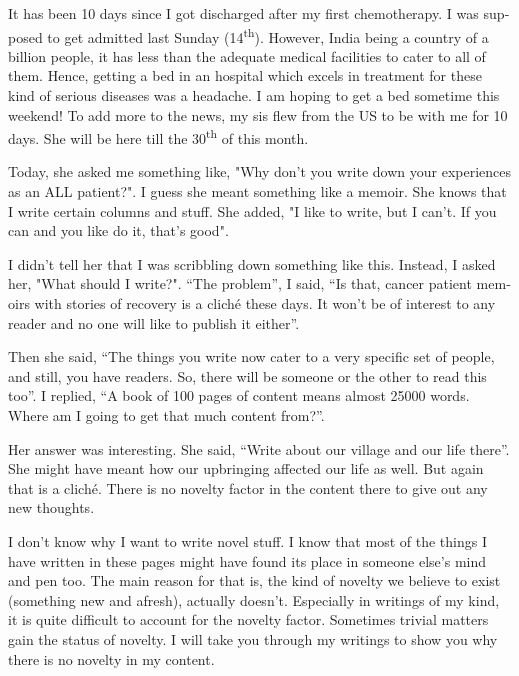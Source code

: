 \begin{english}
\vskip 2pt
\date{Friday November 19 2010}

It has been 10 days since I got discharged after my first chemotherapy. I was supposed to get admitted last Sunday (14\textsuperscript{th}). However, India being a country of a billion people, it has less than the adequate medical facilities to cater to all of them. Hence, getting a bed in an hospital which excels in treatment for these kind of serious diseases was a headache. I am hoping to get a bed sometime this weekend! To add more to the news, my sis flew from the US to be with me for 10 days. She will be here till the 30\textsuperscript{th} of this month. 

Today, she asked me something like, "Why don't you write down your experiences as an ALL patient?". I guess she meant something like a memoir. She knows that I write certain columns and stuff. She added, "I like to write, but I can't. If you can and you like do it, that's good".

I didn't tell her that I was scribbling down something like this. Instead, I asked her, "What should I write?". ``The problem'', I said, ``Is that, cancer patient memoirs with stories of recovery is a cliché these days. It won't be of interest to any reader and no one will like to publish it either''.

Then she said, ``The things you write now cater to a very specific set of people, and still, you have readers. So, there will be someone or the other to read this too''. I replied, ``A book of 100 pages of content means almost 25000 words. Where am I going to get that much content from?''. 

Her answer was interesting. She said, ``Write about our village and our life there''. She might have meant how our upbringing affected our life as well. But again that is a cliché. There is no novelty factor in the content there to give out any new thoughts.

I don't know why I want to write novel stuff. I know that most of the things I have written in these pages might have found its place in someone else's mind and pen too. The main reason for that is, the kind of novelty we believe to exist (something new and afresh), actually doesn't. Especially in writings of my kind, it is quite difficult to account for the novelty factor. Sometimes trivial matters gain the status of novelty. I will take you through my writings to show you why there is no novelty in my content. 


\end{english}
